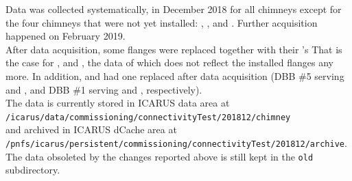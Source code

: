 Data was collected systematically, in December 2018 for all chimneys except
for the four chimneys that were not yet installed: ,
,  and . Further acquisition happened
on February 2019.
\\
After data acquisition, some flanges were replaced together with their \DBB's
That is the case for ,  and , the data
of which does not reflect the installed flanges any more.
In addition,  and  had one \DBB replaced after data
acquisition (DBB \#5 serving  and , and DBB \#1 serving
 and , respectively).
\\
The data is currently stored in ICARUS data area at \\
\texttt{/icarus/data/commissioning/connectivityTest/201812/chimney} \\
and archived in ICARUS dCache area at \\
\texttt{/pnfs/icarus/persistent/commissioning/connectivityTest/201812/archive}.\\
The data obsoleted by the changes reported above is still kept in the \texttt{old} subdirectory.

